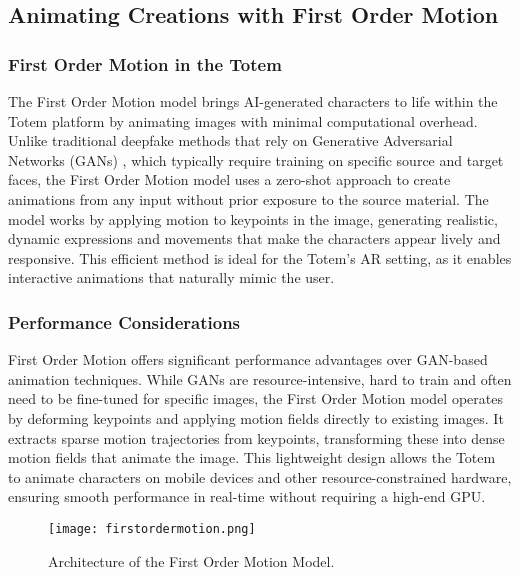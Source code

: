 \subsection{Animating Creations with First Order Motion}

\subsubsection{First Order Motion in the Totem}
The First Order Motion model\cite{Siarohin_2019_NeurIPS} brings AI-generated characters to life within the Totem platform by animating images with minimal computational overhead. 
Unlike traditional deepfake methods\cite{perov2020deepfacelab} that rely on Generative Adversarial Networks (GANs) \cite{goodfellow2014generative}, which typically require training on specific source and target faces, the First Order Motion model uses a zero-shot approach to create animations from any input without prior exposure to the source material.
The model works by applying motion to keypoints in the image, generating realistic, dynamic expressions and movements that make the characters appear lively and responsive.
This efficient method is ideal for the Totem’s AR setting, as it enables interactive animations that naturally mimic the user.

\subsubsection{Performance Considerations}
First Order Motion offers significant performance advantages over GAN-based animation techniques.
While GANs are resource-intensive, hard to train and often need to be fine-tuned for specific images, the First Order Motion model operates by deforming keypoints and applying motion fields directly to existing images.
It extracts sparse motion trajectories from keypoints, transforming these into dense motion fields that animate the image.
This lightweight design allows the Totem to animate characters on mobile devices and other resource-constrained hardware, ensuring smooth performance in real-time without requiring a high-end GPU.

\begin{figure}[!h]
    \centering
    \texttt{[image: firstordermotion.png]}
    \caption{Architecture of the First Order Motion Model.}
    \vspace{0.1cm}
    \label{fig:firstorderarchitecture}
\end{figure}

